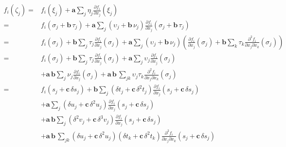 \documentclass[11pt]{article}
\begin{document}
\begin{align*}
f_{i} \! \left( \zeta_{j} \right)
%
=&
f_{i} \! \left( \xi_{j} \right) 
+ \mathbf{a} \sum_{j} \eta_{j} \frac{ \partial f_{i} }{ \partial x_{j} } \! \left( \xi_{j} \right) 
\\
%
=&
f_{i} \! \left( \sigma_{j} + \mathbf{b} \, \tau_{j} \right) 
+ \mathbf{a} \sum_{j} \left( \upsilon_{j} + \mathbf{b} \, \nu_{j} \right)
\frac{ \partial f_{i} }{ \partial x_{j} } 
\! \left( \sigma_{j} + \mathbf{b} \, \tau_{j} \right) 
\\
%
=&
f_{i} \! \left( \sigma_{j} \right) + \mathbf{b} 
\sum_{j} \tau_{j} \frac{ \partial f_{i} }{ \partial x_{j} } 
\! \left( \sigma_{j} \right)
+ \mathbf{a} \sum_{j} \left( \upsilon_{j} + \mathbf{b} \, \nu_{j} \right)
\left( \frac{ \partial f_{i} }{ \partial x_{j} } \! \left( \sigma_{j} \right)
+ \mathbf{b} \sum_{k} \tau_{k}
\frac{ \partial^{2} f_{i} }{ \partial x_{j} \partial x_{k} } \! \left( \sigma_{j} \right) \right) 
\\
%
=&
f_{i} \! \left( \sigma_{j} \right) + \mathbf{b} 
\sum_{j} \tau_{j} \frac{ \partial f_{i} }{ \partial x_{j} } 
\! \left( \sigma_{j} \right)
+ \mathbf{a} \sum_{j}
\upsilon_{j} \frac{ \partial f_{i} }{ \partial x_{j} } \! \left( \sigma_{j} \right)
\\
& + \mathbf{a} \, \mathbf{b} \sum_{j}
 \nu_{j} \frac{ \partial f_{i} }{ \partial x_{j} } \! \left( \sigma_{j} \right)
+ \mathbf{a} \, \mathbf{b} \, \sum_{jk} \upsilon_{j} \tau_{k}
\frac{ \partial^{2} f_{i} }{ \partial x_{j} \partial x_{k} } \! \left( \sigma_{j} \right)
\\
%
=&
f_{i} \! \left( s_{j} + \mathbf{c} \, \delta s_{j} \right) + \mathbf{b} 
\sum_{j} \left( \delta t_{j} + \mathbf{c} \, \delta^{2} t_{j} \right) 
\frac{ \partial f_{i} }{ \partial x_{j} } \! \left( s_{j} + \mathbf{c} \, \delta s_{j} \right)
\\
&+ 
\mathbf{a} \sum_{j}
\left( \delta u_{j} + \mathbf{c} \, \delta^{2} u_{j} \right) 
\frac{ \partial f_{i} }{ \partial x_{j} } \! \left( s_{j} + \mathbf{c} \, \delta s_{j} \right)
\\
& + \mathbf{a} \, \mathbf{b} \sum_{j}
\left( \delta^{2} v_{j} + \mathbf{c} \, \delta^{3} v_{j} \right) \frac{ \partial f_{i} }{ \partial x_{j} } \! \left( s_{j} + \mathbf{c} \, \delta s_{j} \right)
\\
&+ 
\mathbf{a} \, \mathbf{b} \, \sum_{jk} 
\left( \delta u_{j} + \mathbf{c} \, \delta^{2} u_{j} \right) 
\left( \delta t_{k} + \mathbf{c} \, \delta^{2} t_{k} \right)
\frac{ \partial^{2} f_{i} }{ \partial x_{j} \partial x_{k} } \! \left( s_{j} + \mathbf{c} \, \delta s_{j} \right)

\end{align*}
\end{document}
